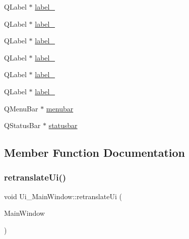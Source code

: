 \begin{DoxyCompactItemize}
\item 
Q\+Label $\ast$ \hyperlink{classUi__MainWindow_a0376fd90247280e7c7957cc70628708c}{label\+\_}
\item 
Q\+Label $\ast$ \hyperlink{classUi__MainWindow_a78c7e10730b43c6700cd7216911ed76a}{label\+\_}
\item 
Q\+Label $\ast$ \hyperlink{classUi__MainWindow_ad6bab8fb8903b8f41afea1218ee52695}{label\+\_}
\item 
Q\+Label $\ast$ \hyperlink{classUi__MainWindow_a663f728e6244926a795c6e6892673b1d}{label\+\_}
\item 
Q\+Label $\ast$ \hyperlink{classUi__MainWindow_a13936e6f18b1c90402b3c7a3c92b6cdb}{label\+\_}
\item 
Q\+Label $\ast$ \hyperlink{classUi__MainWindow_af183bfbfb9f38bbdd60caf92b15e23dc}{label\+\_}
\item 
Q\+Menu\+Bar $\ast$ \hyperlink{classUi__MainWindow_adf43d9a67adaec750aaa956b5e082f09}{menubar}
\item 
Q\+Status\+Bar $\ast$ \hyperlink{classUi__MainWindow_a1687cceb1e2787aa1f83e50433943a91}{statusbar}
\end{DoxyCompactItemize}


\subsection{Member Function Documentation}
\mbox{\label{classUi__MainWindow_a097dd160c3534a204904cb374412c618}} 
\subsubsection{\texorpdfstring{retranslate\+Ui()}{retranslateUi()}}
{\footnotesize\ttfamily void Ui\+\_\+\+Main\+Window\+::retranslate\+Ui (\begin{DoxyParamCaption}\item[{Q\+Main\+Window $\ast$}]{Main\+Window }\end{DoxyParamCaption})\hspace{0.3cm}{\ttfamily [inline]}}

\mbox{\label{classUi__MainWindow_acf4a0872c4c77d8f43a2ec66ed849b58}} 
